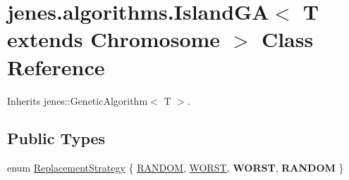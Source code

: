 \hypertarget{classjenes_1_1algorithms_1_1_island_g_a_3_01_t_01extends_01_chromosome_01_4}{
\section{jenes.algorithms.IslandGA$<$ T extends Chromosome $>$ Class Reference}
\label{classjenes_1_1algorithms_1_1_island_g_a_3_01_t_01extends_01_chromosome_01_4}
}
Inherits jenes::GeneticAlgorithm$<$ T $>$.

\subsection*{Public Types}
\begin{CompactItemize}
\item 
enum \hyperlink{classjenes_1_1algorithms_1_1_island_g_a_3_01_t_01extends_01_chromosome_01_4_eb0e7c4ddd30e9472cfd2a280544ff51}{ReplacementStrategy} \{ \hyperlink{_island_g_a_8java_da95b83b7d620e80c70fbed3b8159de1a2b65445a3a16f164c5e811064d75726}{RANDOM}, 
\hyperlink{_island_g_a_8java_da95b83b7d620e80c70fbed3b8159de1ed58eb79392224559f176f4794c570e1}{WORST}, 
\textbf{WORST}, 
\textbf{RANDOM}
 \}
\end{CompactItemize}
